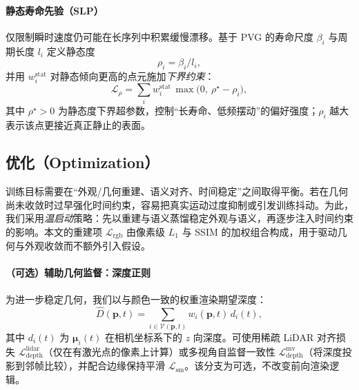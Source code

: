 \documentclass[10pt,conference]{IEEEtran} %
\begin{document}
\paragraph{静态寿命先验（SLP）}
仅限制瞬时速度仍可能在长序列中积累缓慢漂移。基于 PVG 的寿命尺度 $\beta_i$ 与周期长度 $l_i$ 定义静态度
\begin{equation}
\rho_i=\beta_i/l_i,
\end{equation}
并用 $w_i^{\mathrm{stat}}$ 对静态倾向更高的点元施加\emph{下界约束}：
\begin{equation}
\mathcal L_{\rho}=\sum_{i} w_i^{\mathrm{stat}}\,
\max\!\big(0,\ \rho^\star-\rho_i\big),
\label{eq:slp_loss}
\end{equation}
其中 $\rho^\star>0$ 为静态度下界超参数，控制“长寿命、低频摆动”的偏好强度；$\rho_i$ 越大表示该点更接近真正静止的表面。

\subsection{优化（Optimization）}
训练目标需要在“外观/几何重建、语义对齐、时间稳定”之间取得平衡。若在几何尚未收敛时过早强化时间约束，容易把真实运动过度抑制或引发训练抖动。为此，我们采用\emph{温启动}策略：先以重建与语义蒸馏稳定外观与语义，再逐步注入时间约束的影响。本文的重建项 $\mathcal L_{\mathrm{rgb}}$ 由像素级 $L_1$ 与 SSIM 的加权组合构成，用于驱动几何与外观收敛而不额外引入假设。

\paragraph{（可选）辅助几何监督：深度正则}
为进一步稳定几何，我们以与颜色一致的权重渲染期望深度：
\[
\hat D(\mathbf p,t)=\sum_{i\in\mathcal V(\mathbf p,t)} w_i(\mathbf p,t)\,d_i(t),
\]
其中 $d_i(t)$ 为 $\bm{\mu}_i(t)$ 在相机坐标系下的 $z$ 向深度。可使用稀疏 LiDAR 对齐损失 $\mathcal L_{\mathrm{depth}}^{\mathrm{lidar}}$（仅在有激光点的像素上计算）或多视角自监督一致性 $\mathcal L_{\mathrm{depth}}^{\mathrm{mv}}$（将深度投影到邻帧比较），并配合边缘保持平滑 $\mathcal L_{\mathrm{sm}}$。该分支为可选，不改变前向渲染逻辑。
\end{document}
